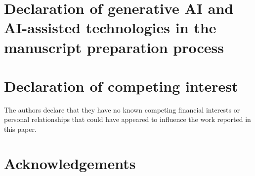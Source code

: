 \documentclass[final,5p,times,twocolumn]{elsarticle}
\begin{document}
\section*{Declaration of generative AI and AI-assisted technologies in the manuscript preparation process}

\section*{Declaration of competing interest}
The authors declare that they have no known competing financial interests or personal relationships that could have appeared to influence the work reported in this paper.

\section*{Acknowledgements}



\end{document}
